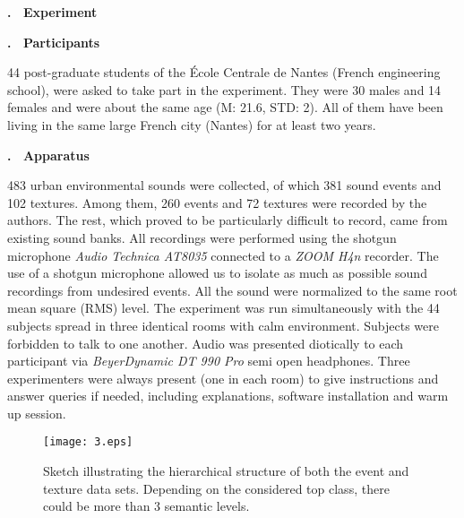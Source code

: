 \documentclass[12pt, titlepage, reqno]{article} %
\renewcommand{\section}[1]{\medskip \addtocounter{section}{1}\raggedright 
     \textbf{\Roman{section}. \ #1}\medskip \setcounter{subsection}{0}
    \setlength{\parindent}{5ex}
 }
\renewcommand{\subsection}[1]{\medskip \addtocounter{subsection}{1}\raggedright
    \textbf{\Alph{subsection}. \ #1} \medskip \setcounter{subsubsection}{0}\setlength{\parindent}{5ex}
}
\begin{document}

\section{Experiment}
\subsection{Participants}
44 post-graduate students of the {\'E}cole Centrale de Nantes (French engineering school), were asked to take part in the experiment. They were 30 males and 14 females and were about the same age (M: 21.6, STD: 2). All of them have been living in the same large French city (Nantes) for at least two years.  

\subsection{Apparatus}
483 urban environmental sounds were collected, of which 381 sound events and 102 textures. Among them, 260 events and 72 textures were recorded by the authors. The rest, which proved to be particularly difficult to record, came from existing sound banks. All recordings were performed using the shotgun microphone \textit{Audio Technica AT8035} connected to a \textit{ZOOM H4n} recorder. The use of a shotgun microphone allowed us to isolate as much as possible sound recordings from undesired events. All the sound were normalized to the same root mean square (RMS) level. The experiment was run simultaneously with the 44 subjects spread in three identical rooms with calm environment. Subjects were forbidden to talk to one another. Audio was presented diotically to each participant via \textit{BeyerDynamic DT 990 Pro} semi open headphones. Three experimenters were always present (one in each room) to give instructions and answer queries if needed, including explanations, software installation and warm up session. 


\begin{figure}[t!]
\begin{center}
\texttt{[image: 3.eps]}
\caption{\label{datasetexample} Sketch illustrating  the hierarchical structure of both the event and texture data sets. Depending on the considered top class, there could be more than 3 semantic levels.}
\end{center}
\end{figure}
\end{document}
